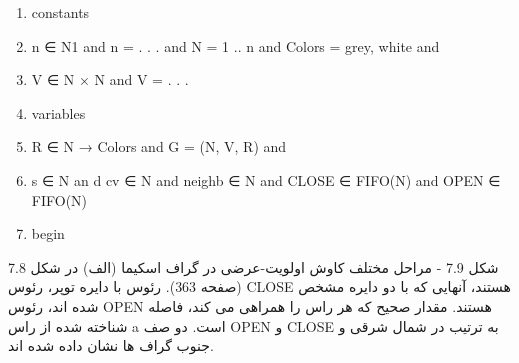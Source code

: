 \documentclass{book} %
\begin{document}
\begin{latin}
    
    \begin{enumerate}
        
        \item constants
        \item n ∈ N1 and n = . . . and N = 1 .. n and Colors = {grey, white} and
        \item V ∈ N × N and V = {. . .}
        \item variables
        \item R ∈ N → Colors and G = (N, V, R) and
        \item s ∈ N an d cv ∈ N and neighb ∈ N and CLOSE ∈ FIFO(N) and OPEN ∈ FIFO(N)
        \item begin
        
        
    \end{enumerate}
    
\end{latin}

شکل 7.9 - مراحل مختلف کاوش اولویت-عرضی در گراف اسکیما (الف) در شکل 7.8 (صفحه 363). رئوس با دایره توپر، رئوس CLOSE هستند، آنهایی که با دو دایره مشخص شده اند، رئوس OPEN هستند. مقدار صحیح که هر راس را همراهی می کند، فاصله شناخته شده از راس a است. دو صف OPEN و CLOSE به ترتیب در شمال شرقی و جنوب گراف ها نشان داده شده اند.
\end{document}
